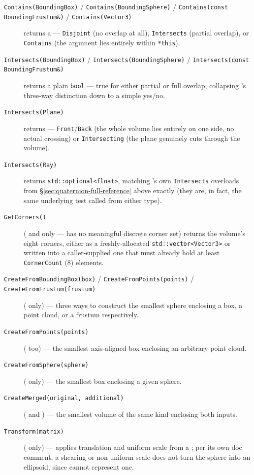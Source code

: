 \begin{description}
\item[\texttt{Contains(BoundingBox)} / \texttt{Contains(BoundingSphere)} /
  \texttt{Contains(const BoundingFrustum\&)} / \texttt{Contains(Vector3)}] returns a
   --- \texttt{Disjoint} (no overlap at all), \texttt{Intersects}
  (partial overlap), or \texttt{Contains} (the argument lies entirely within \texttt{*this}).
\item[\texttt{Intersects(BoundingBox)} / \texttt{Intersects(BoundingSphere)} /
  \texttt{Intersects(const BoundingFrustum\&)}] returns a plain \texttt{bool} --- true for
  either partial or full overlap, collapsing 's three-way distinction
  down to a simple yes/no.
\item[\texttt{Intersects(Plane)}] returns  ---
  \texttt{Front}/\texttt{Back} (the whole volume lies entirely on one side, no actual crossing)
  or \texttt{Intersecting} (the plane genuinely cuts through the volume).
\item[\texttt{Intersects(Ray)}] returns \texttt{std::optional<float>}, matching 's
  own \texttt{Intersects} overloads from \S\ref{sec:quaternion-full-reference} above exactly
  (they are, in fact, the same underlying test called from either type).
\item[\texttt{GetCorners()}] ( and  only ---
   has no meaningful discrete corner set) returns the volume's eight
  corners, either as a freshly-allocated \texttt{std::vector<Vector3>} or written into a
  caller-supplied one that must already hold at least \texttt{CornerCount} (8) elements.
\item[\texttt{CreateFromBoundingBox(box)} / \texttt{CreateFromPoints(points)} /
  \texttt{CreateFromFrustum(frustum)}] ( only) --- three ways to
  construct the smallest sphere enclosing a box, a point cloud, or a frustum respectively.
\item[\texttt{CreateFromPoints(points)}] ( too) --- the smallest
  axis-aligned box enclosing an arbitrary point cloud.
\item[\texttt{CreateFromSphere(sphere)}] ( only) --- the smallest box
  enclosing a given sphere.
\item[\texttt{CreateMerged(original, additional)}] ( and
  ) --- the smallest volume of the same kind enclosing both inputs.
\item[\texttt{Transform(matrix)}] ( only) --- applies translation and
  uniform scale from a ; per its own doc comment, a shearing or non-uniform
  scale does not turn the sphere into an ellipsoid, since  cannot
  represent one.
\end{description}

